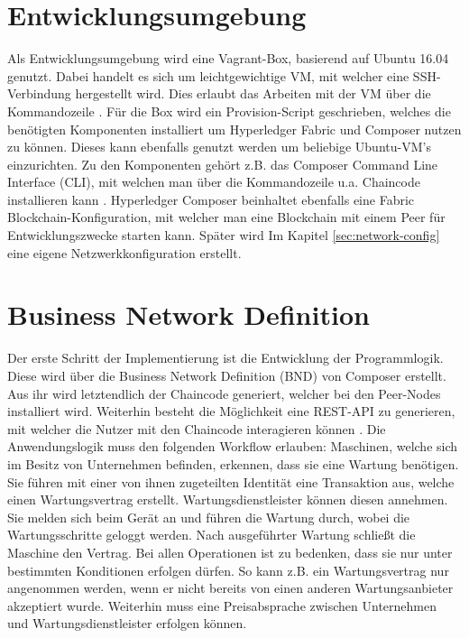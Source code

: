 \section{Entwicklungsumgebung}
Als Entwicklungsumgebung wird eine Vagrant-Box, basierend auf Ubuntu 16.04 genutzt. Dabei handelt es sich um leichtgewichtige VM, mit welcher eine SSH-Verbindung hergestellt wird. Dies erlaubt das Arbeiten mit der VM über die Kommandozeile \cite{VagrantTeamVagrantHashiCorp}. Für die Box wird ein Provision-Script geschrieben, welches die benötigten Komponenten installiert um Hyperledger Fabric und Composer nutzen zu können. Dieses kann ebenfalls genutzt werden um beliebige Ubuntu-VM's einzurichten. Zu den Komponenten gehört z.B. das Composer Command Line Interface (CLI), mit welchen man über die Kommandozeile u.a. Chaincode installieren kann \cite{HyperledgerComposerTeamDevelopmentEnvironmentHyperledger}. Hyperledger Composer beinhaltet ebenfalls eine Fabric Blockchain-Konfiguration, mit welcher man eine Blockchain mit einem Peer für Entwicklungszwecke starten kann. Später wird Im Kapitel \ref{sec:network-config} eine eigene Netzwerkkonfiguration erstellt.

\section{Business Network Definition}
Der erste Schritt der Implementierung ist die Entwicklung der Programmlogik. Diese wird über die Business Network Definition (BND) von Composer erstellt. Aus ihr wird letztendlich der Chaincode generiert, welcher bei den Peer-Nodes installiert wird. Weiterhin besteht die Möglichkeit eine REST-API zu generieren, mit welcher die Nutzer mit den Chaincode interagieren können \cite{HyperledgerComposerTeamDeveloperTutorialHyperledger}. Die Anwendungslogik muss den folgenden Workflow erlauben: Maschinen, welche sich im Besitz von Unternehmen befinden, erkennen, dass sie eine Wartung benötigen. Sie führen mit einer von ihnen zugeteilten Identität eine Transaktion aus, welche einen Wartungsvertrag erstellt. Wartungsdienstleister können diesen annehmen. Sie melden sich beim Gerät an und führen die Wartung durch, wobei die Wartungsschritte geloggt werden. Nach ausgeführter Wartung schließt die Maschine den Vertrag. Bei allen Operationen ist zu bedenken, dass sie nur unter bestimmten Konditionen erfolgen dürfen. So kann z.B. ein Wartungsvertrag nur angenommen werden, wenn er nicht bereits von einen anderen Wartungsanbieter akzeptiert wurde. Weiterhin muss eine Preisabsprache zwischen Unternehmen und Wartungsdienstleister erfolgen können. 

